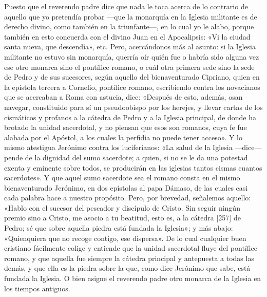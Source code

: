 Puesto que el reverendo padre dice que nada le toca acerca de lo contrario de aquello que yo pretendía probar —que la monarquía en la Iglesia militante es de derecho divino, como también en la triunfante—, en lo cual yo le alabo, porque también en esto concuerda con el divino Juan en el Apocalipsis: «Vi la ciudad santa nueva, que descendía», etc. Pero, acercándonos más al asunto: si la Iglesia militante no estuvo sin monarquía, querría oír quién fue o habría sido alguna vez ese otro monarca sino el pontífice romano, o cuál otra primera sede sino la sede de Pedro y de sus sucesores, según aquello del bienaventurado Cipriano, quien en la epístola tercera a Cornelio, pontífice romano, escribiendo contra los novacianos que se acercaban a Roma con astucia, dice: «Después de esto, además, osan navegar, constituido para sí un pseudoobispo por los herejes, y llevar cartas de los cismáticos y profanos a la cátedra de Pedro y a la Iglesia principal, de donde ha brotado la unidad sacerdotal, y no piensan que esos son romanos, cuya fe fue alabada por el Apóstol, a los cuales la perfidia no puede tener acceso». Y lo mismo atestigua Jerónimo contra los luciferianos: «La salud de la Iglesia —dice— pende de la dignidad del sumo sacerdote; a quien, si no se le da una potestad exenta y eminente sobre todos, se producirán en las iglesias tantos cismas cuantos sacerdotes». Y que aquel sumo sacerdote sea el romano consta en el mismo bienaventurado Jerónimo, en dos epístolas al papa Dámaso, de las cuales casi cada palabra hace a nuestro propósito. Pero, por brevedad, señalemos aquello: «Hablo con el sucesor del pescador y discípulo de Cristo. Sin seguir ningún premio sino a Cristo, me asocio a tu beatitud, esto es, a la cátedra [257] de Pedro; sé que sobre aquella piedra está fundada la Iglesia»; y más abajo: «Quienquiera que no recoge contigo, ese dispersa». De lo cual cualquier buen cristiano fácilmente colige y entiende que la unidad sacerdotal fluye del pontífice romano, y que aquella fue siempre la cátedra principal y antepuesta a todas las demás, y que ella es la piedra sobre la que, como dice Jerónimo que sabe, está fundada la Iglesia. O bien asigne el reverendo padre otro monarca de la Iglesia en los tiempos antiguos.

